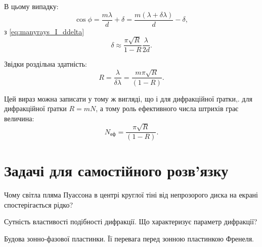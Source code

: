 \begin{solutionexample}
    В цьому випадку:
    \begin{equation*}
        \cos\phi = \frac{m\lambda}{d} + \delta = \frac{m(\lambda + \delta\lambda)}{d} - \delta,
    \end{equation*}
    з \eqref{eq:manyrays_I_ddelta}
    \begin{equation*}
        \delta \approx \frac{\pi \sqrt{R}}{1-R}\frac{\lambda}{2d}.
    \end{equation*}

    Звідки роздільна здатність:
    \begin{equation*}
        R = \frac{\lambda}{\delta\lambda} = \frac{m \pi  \sqrt{R}}{(1-R) }.
    \end{equation*}

    Цей вираз можна записати у тому ж вигляді, що і для дифракційної
    ґратки,. для дифракційної ґратки $R = mN$, а тому роль ефективного числа штрихів грає величина:
    \begin{equation*}
        N_\text{еф} = \frac{ \pi  \sqrt{R}}{(1-R) }.
    \end{equation*}

\end{solutionexample}




\section{Задачі для самостійного розв’язку }



\begin{problem}%
    Чому світла пляма Пуассона в центрі круглої тіні від непрозорого
    диска на екрані спостерігається рідко?
\end{problem}


\begin{problem}%
    Сутність властивості подібності дифракції. Що характеризує параметр
    дифракції?
\end{problem}


\begin{problem}%
    Будова зонно-фазової пластинки. Її перевага перед зонною
    пластинкою Френеля.
\end{problem}


